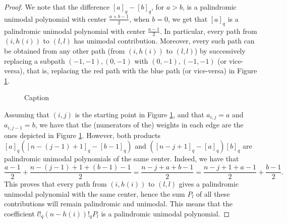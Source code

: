 \documentclass[10pt]{amsart}
\theoremstyle{definition}
\begin{document}
\begin{proof}
 We note that the difference $[a]_q-[b]_q$, for $a>b$, is a palindromic unimodal polynomial with center $\frac{a+b-1}{2}$,  when $b=0$, we get that $[a]_q$ is a palindromic unimodal polynomial with center $\frac{a-1}{2}$. In particular, every path from $(i,h(i))$ to $(l,l)$ has unimodal contribution. Moreover, every such path can be obtained from any other path (from $(i,h(i))$ to $(l,l)$) by successively replacing a subpath  $(-1,-1),(0,-1)$ with $(0,-1),(-1,-1)$ (or vice-versa), that is, replacing the red path with the blue path (or vice-versa) in Figure \ref{fig:subpath}.
\begin{figure}[htb]
    \centering
    \caption{Caption}
    \label{fig:subpath}
\end{figure}

Assuming that $(i,j)$ is the starting point in Figure \ref{fig:subpath}, and that $a_{i,j}=a$ and $a_{i,j-1}=b$, we have that the (numerators of the) weights in each edge are the ones depicted in Figure \ref{fig:subpath}. However, both products $[a]_q([n-(j-1)+1]_q-[b-1]_q)$  and $([n-j+1]_q-[a]_q)[b]_q$ are palindromic unimodal polynomials of the same center. Indeed, we have that
\[
\frac{a-1}{2}+\frac{n-(j-1)+1+(b-1)-1}{2}=\frac{n-j+a+b-1}{2}=\frac{n-j+1+a-1}{2}+\frac{b-1}{2}.
\]
This proves that every path from $(i,h(i))$ to $(l,l)$ gives a palindromic unimodal polynomial with the same center, hence the sum $P_l$ of all these contributions will remain palindromic and unimodal. This means that the coefficient $l!_q(n-h(i))!_qP_l$ is a palindromic unimodal polynomial.
\end{proof}
\end{document}
